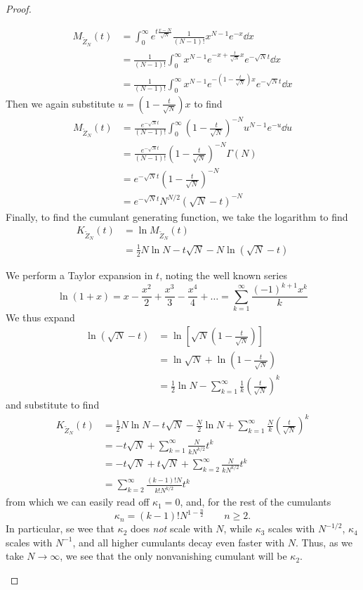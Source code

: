 \begin{proof}
\begin{parts}
	\begin{align*}
		M_{\tilde{Z}_N}(t) &= \int_0^\infty e^{t\frac{x-N}{\sqrt{N} }} \frac{1 }{(N-1)!}x^{N-1}e^{-x}\dd{x} \\
				   &= \frac{1 }{(N-1)!}\int_0^\infty x^{N-1}e^{-x + \frac{t}{\sqrt{N} }x}e^{-\sqrt{N}t}\dd{x} \\
				    &= \frac{1 }{(N-1)!}\int_0^\infty x^{N-1}e^{-\left(1 - \frac{t}{\sqrt{N} }\right)x}e^{-\sqrt{N}t}\dd{x}
	\end{align*}
Then we again substitute $u=\left(1 - \frac{t}{\sqrt{N} }\right)x$ to find
\begin{align*}
	M_{\tilde{Z}_N}(t) &= \frac{e^{-\sqrt{N}t}}{(N-1)!}\int_0^\infty \left(1 - \frac{t}{\sqrt{N} }\right)^{-N}u^{N-1}e^{-u}\dd{u}\\
	&= \frac{e^{-\sqrt{N}t}}{(N-1)!}\left(1 - \frac{t}{\sqrt{N} }\right)^{-N}\Gamma(N)\\
	&= e^{-\sqrt{N}t}\left(1 - \frac{t}{\sqrt{N} }\right)^{-N}\\
	&=e^{-\sqrt{N}t}N^{N/2}(\sqrt{N}-t)^{-N}
\end{align*}
Finally, to find the cumulant generating function, we take the logarithm to find
\begin{align*}
	K_{\tilde{Z}_N}(t) &= \ln M_{\tilde{Z}_N}(t)\\
	&=\frac 12 N\ln N - t\sqrt{N} - N\ln(\sqrt{N}-t)
\end{align*}
\item We perform a Taylor expansion in $t$, noting the well known series
\[\ln(1+x)=x-\frac{x^2}{2}+\frac{x^3}{3}-\frac{x^4}{4}+\dots=\sum_{k=1}^\infty \frac{(-1)^{k+1}x^k}{k}\]
We thus expand
\begin{align*}
	\ln (\sqrt{N}-t)&= \ln\left[\sqrt{N}\left(1-\frac{t}{\sqrt{N}}\right)\right]\\
	&= \ln \sqrt{N} + \ln\left(1-\frac{t}{\sqrt{N}}\right)\\
	&= \frac 12\ln N - \sum_{k=1}^\infty \frac 1k \left(\frac{t}{\sqrt{N}}\right)^k
\end{align*}
and substitute to find
\begin{align*}
K_{\tilde{Z}_N}(t) &= \frac 12 N\ln N - t\sqrt{N} - \frac N2 \ln N + \sum_{k=1}^\infty \frac{N}{k}\left(\frac{t}{\sqrt{N}}\right)^k\\
&=-t\sqrt{N} + \sum_{k=1}^\infty \frac{N}{kN^{k/2}}t^k\\
&=-t\sqrt{N} +t\sqrt{N} + \sum_{k=2}^\infty \frac{N}{kN^{k/2}}t^k\\
&= \sum_{k=2}^\infty \frac{(k-1)!N}{k! N^{k/2}}t^k
\end{align*}
from which we can easily read off $\kappa_1=0$, and, for the rest of the cumulants
\[
	\kappa_n = (k-1)! N^{1 - \frac{n}{2}} \qquad n \ge 2
.\] 
In particular, se wee that $\kappa_2$ does \emph{not} scale with $N$, while $\kappa_3$ scales with $N^{- 1 / 2}$, $\kappa_4$ scales with $N^{-1}$, and all higher cumulants decay even faster with $N$. Thus, as we take $N\to\infty$, we see that the only nonvanishing cumulant will be $\kappa_2$. 


\end{parts}
\end{proof}
